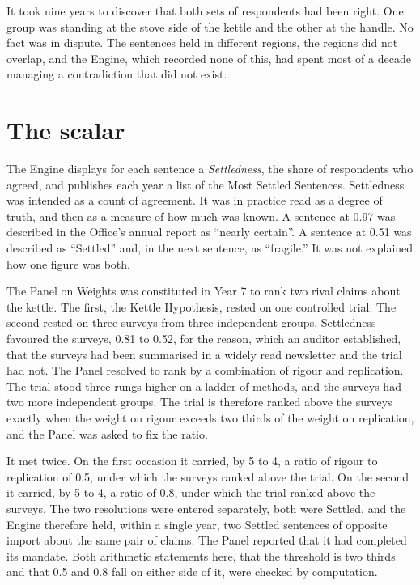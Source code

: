 \documentclass[11pt]{article}
\begin{document}
It took nine years to discover that both sets of respondents had been right. One group was standing at the stove side of the kettle and the other at the handle. No fact was in dispute. The sentences held in different regions, the regions did not overlap, and the Engine, which recorded none of this, had spent most of a decade managing a contradiction that did not exist.

\section{The scalar}\label{sec:scalar}

The Engine displays for each sentence a \emph{Settledness}, the share of respondents who agreed, and publishes each year a list of the Most Settled Sentences. Settledness was intended as a count of agreement. It was in practice read as a degree of truth, and then as a measure of how much was known. A sentence at 0.97 was described in the Office's annual report as ``nearly certain''. A sentence at 0.51 was described as ``Settled'' and, in the next sentence, as ``fragile.'' It was not explained how one figure was both.

The Panel on Weights was constituted in Year 7 to rank two rival claims about the kettle. The first, the Kettle Hypothesis, rested on one controlled trial. The second rested on three surveys from three independent groups. Settledness favoured the surveys, 0.81 to 0.52, for the reason, which an auditor established, that the surveys had been summarised in a widely read newsletter and the trial had not. The Panel resolved to rank by a combination of rigour and replication. The trial stood three rungs higher on a ladder of methods, and the surveys had two more independent groups. The trial is therefore ranked above the surveys exactly when the weight on rigour exceeds two thirds of the weight on replication, and the Panel was asked to fix the ratio.

It met twice. On the first occasion it carried, by 5 to 4, a ratio of rigour to replication of 0.5, under which the surveys ranked above the trial. On the second it carried, by 5 to 4, a ratio of 0.8, under which the trial ranked above the surveys. The two resolutions were entered separately, both were Settled, and the Engine therefore held, within a single year, two Settled sentences of opposite import about the same pair of claims. The Panel reported that it had completed its mandate. Both arithmetic statements here, that the threshold is two thirds and that 0.5 and 0.8 fall on either side of it, were checked by computation.
\end{document}
